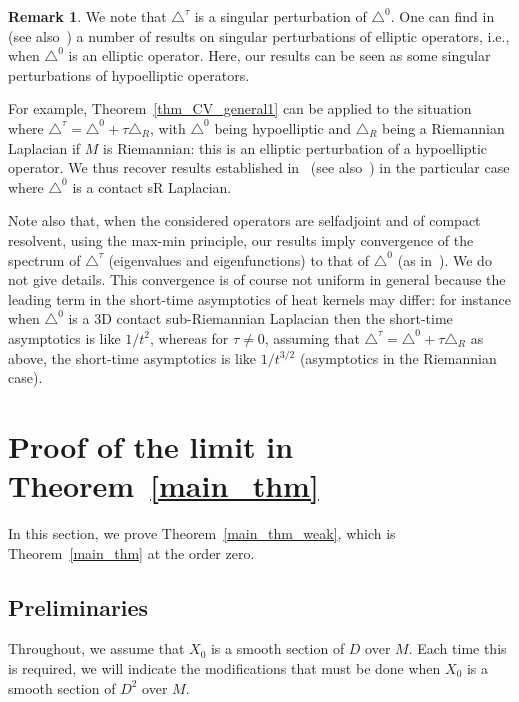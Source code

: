 \documentclass[10pt]{amsart}
\theoremstyle{definition}\newtheorem{defi}[theo]{Definition}\newtheorem{rema}[theo]{Remark}\newtheorem{exam}[theo]{Example}\newtheorem{exem}[theo]{Example}\newtheorem{nota}[theo]{Notation}
\begin{document}
\begin{rema}
We note that $\triangle^\tau$ is a singular perturbation of $\triangle^0$. One can find in~\cite{Lions_perturbations} (see also~\cite{Huet}) a number of results on singular perturbations of elliptic operators, i.e., when $\triangle^0$ is an elliptic operator. Here, our results can be seen as some singular perturbations of hypoelliptic operators.

For example, Theorem~\ref{thm_CV_general1} can be applied to the situation where $\triangle^\tau = \triangle^0 + \tau \triangle_R$, with $\triangle^0$ being hypoelliptic and $\triangle_R$ being a Riemannian Laplacian if $M$ is Riemannian: this is an elliptic perturbation of a hypoelliptic operator. We thus recover results established in~\cite[Theorem~7.2]{Rumin} (see also~\cite{Ge}) in the particular case where $\triangle^0$ is a contact sR Laplacian.

Note also that, when the considered operators are selfadjoint and of compact resolvent, using the max-min principle, our results imply convergence of the spectrum of $\triangle^\tau$ (eigenvalues and eigenfunctions) to that of $\triangle^0$ (as in~\cite{Fukaya,Ge,Rumin}). We do not give details. This convergence is of course not uniform in general because the leading term in the short-time asymptotics of heat kernels may differ: for instance when $\triangle^0$ is a 3D contact sub-Riemannian Laplacian then the short-time asymptotics is like $1/t^2$, whereas for $\tau\neq 0$, assuming that $\triangle^\tau = \triangle^0 + \tau \triangle_R$ as above, the short-time asymptotics is like $1/t^{3/2}$ (asymptotics in the Riemannian case).
\end{rema}



\section{Proof of the limit in Theorem~\ref{main_thm}}\label{sec:proof_main_thm_prelim}
In this section, we prove Theorem~\ref{main_thm_weak}, which is Theorem~\ref{main_thm} at the order zero.


\subsection{Preliminaries}
Throughout, we assume that $X_0$ is a smooth section of $D$ over $M$. Each time this is required, we will indicate the modifications that must be done when $X_0$ is a smooth section of $D^2$ over $M$.
\end{document}
